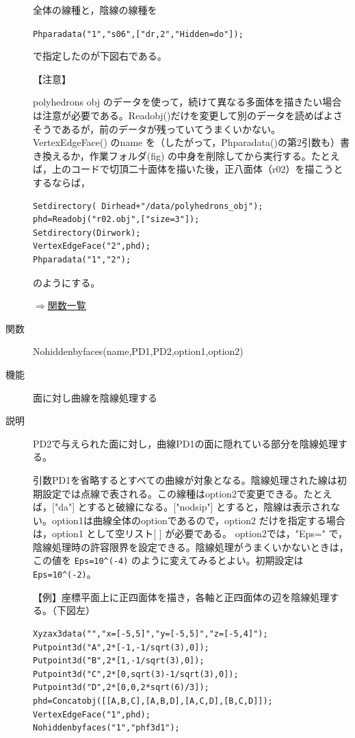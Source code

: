 \documentclass[papersize,a4paper,12pt,uplatex]{jsarticle}
\begin{document}
\begin{description}
\vspace{\baselineskip}
全体の線種と，陰線の線種を

\verb|Phparadata("1","s06",["dr,2","Hidden=do"]);|

で指定したのが下図右である。

 \begin{center}\scalebox{0.8} {} \hspace{5mm}\scalebox{0.8}{} \end{center}

【注意】

polyhedrons obj のデータを使って，続けて異なる多面体を描きたい場合は注意が必要である。Readobj()だけを変更して別のデータを読めばよさそうであるが，前のデータが残っていてうまくいかない。VertexEdgeFace() のname を（したがって，Phparadata()の第2引数も）書き換えるか，作業フォルダ(fig) の中身を削除してから実行する。たとえば，上のコードで切頂二十面体を描いた後，正八面体（r02）を描こうとするならば，
\begin{verbatim}
Setdirectory( Dirhead+"/data/polyhedrons_obj");
phd=Readobj("r02.obj",["size=3"]);
Setdirectory(Dirwork);
VertexEdgeFace("2",phd);
Phparadata("1","2");
\end{verbatim}
のようにする。


\begin{flushright} \hyperlink{functionlist}{$\Rightarrow$関数一覧}\end{flushright}

\hypertarget{nohiddenbyfaces}{}
\item[関数]Nohiddenbyfaces(name,PD1,PD2,option1,option2)
\item[機能]面に対し曲線を陰線処理する
\item[説明]PD2で与えられた面に対し，曲線PD1の面に隠れている部分を陰線処理する。

引数PD1を省略するとすべての曲線が対象となる。陰線処理された線は初期設定では点線で表される。この線種はoption2で変更できる。たとえば，["da"] とすると破線になる。["nodsip"] とすると，陰線は表示されない。option1は曲線全体のoptionであるので，option2 だけを指定する場合は，option1 として空リスト[ ] が必要である。
option2では，"Eps=" で，陰線処理時の許容限界を設定できる。陰線処理がうまくいかないときは，この値を \verb|Eps=10^(-4)| のように変えてみるとよい。初期設定は \verb|Eps=10^(-2)|。

\vspace{\baselineskip}
【例】座標平面上に正四面体を描き，各軸と正四面体の辺を陰線処理する。（下図左）
\begin{verbatim}
Xyzax3data("","x=[-5,5]","y=[-5,5]","z=[-5,4]");
Putpoint3d("A",2*[-1,-1/sqrt(3),0]);
Putpoint3d("B",2*[1,-1/sqrt(3),0]);
Putpoint3d("C",2*[0,sqrt(3)-1/sqrt(3),0]);
Putpoint3d("D",2*[0,0,2*sqrt(6)/3]);
phd=Concatobj([[A,B,C],[A,B,D],[A,C,D],[B,C,D]]);
VertexEdgeFace("1",phd);
Nohiddenbyfaces("1","phf3d1"); 
\end{verbatim}


\end{description}
\end{document}
